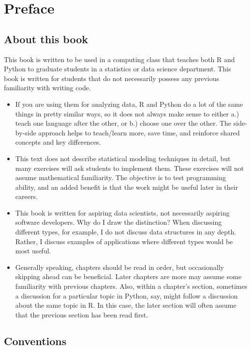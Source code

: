 \documentclass[
  12pt,
]{krantz}
\begin{document}
\hypertarget{preface}{%
\chapter*{Preface}\label{preface}}


\hypertarget{about-this-book}{%
\section*{About this book}\label{about-this-book}}


This book is written to be used in a computing class that teaches both R and Python to graduate students in a statistics or data science department. This book is written for students that do not necessarily possess any previous familiarity with writing code.

\begin{itemize}
\item
  If you are using them for analyzing data, R and Python do a lot of the same things in pretty similar ways, so it does not always make sense to either a.) teach one language after the other, or b.) choose one over the other. The side-by-side approach helps to teach/learn more, save time, and reinforce shared concepts and key differences.
\item
  This text does not describe statistical modeling techniques in detail, but many exercises will ask students to implement them. These exercises will not assume mathematical familiarity. The objective is to test programming ability, and an added benefit is that the work might be useful later in their careers.
\item
  This book is written for aspiring data scientists, not necessarily aspiring software developers. Why do I draw the distinction? When discussing different types, for example, I do not discuss data structures in any depth. Rather, I discuss examples of applications where different types would be most useful.
\item
  Generally speaking, chapters should be read in order, but occasionally skipping ahead can be beneficial. Later chapters are more may assume some familiarity with previous chapters. Also, within a chapter's section, sometimes a discussion for a particular topic in Python, say, might follow a discussion about the same topic in R. In this case, the later section will often assume that the previous section has been read first.
\end{itemize}

\hypertarget{conventions}{%
\section*{Conventions}\label{conventions}}
\end{document}
